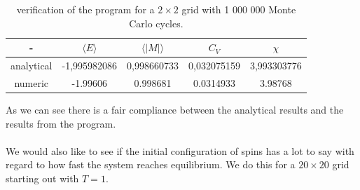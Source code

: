 \documentclass[a4paper,english, 10pt, twoside]{article}
\begin{document}
\begin{table}[H]
\centering
 \begin{tabular}{|c|c|c|c|c|}
 \hline
  - & $\langle E \rangle$ & $\langle |M|\rangle$ & $C_V$ & $\chi$  \\
\hline
  analytical & -1,995982086 & 0,998660733& 0,032075159& 3,993303776\\
  numeric & -1.99606 & 0.998681 & 0.0314933 & 3.98768\\
  \hline
 \end{tabular}
 \caption{verification of the program for a $2\times 2$ grid with 1 000 000 Monte Carlo cycles.}
\label{table2}
\end{table}
As we can see there is a fair compliance between the analytical results and the results from the program.\\ \\
We would also like to see if the initial configuration of spins has a lot to say with regard to how fast the system reaches 
equilibrium. We do this for a $20 \times 20$ grid starting out with $T = 1$. 
\end{document}
